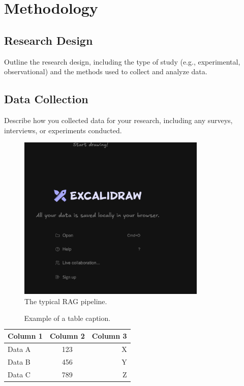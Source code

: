 \documentclass[12pt]{report}
\begin{document}
\newpage

\chapter{Methodology}
\section{Research Design}
Outline the research design, including the type of study (e.g., experimental, observational) and the methods used to collect and analyze data.
\section{Data Collection}
Describe how you collected data for your research, including any surveys, interviews, or experiments conducted.
\begin{figure}
    \centering
    \includegraphics[width=0.8\textwidth]{images/1/apa-ini.png}
    \caption{The typical RAG pipeline.}
    \label{fig:example2}
\end{figure}

\lipsum[1-2] %

\begin{table}[htbp]
  \centering
  \caption{Example of a table caption.}
  \label{tab:example1}
  \begin{tabular}{|l|c|r|}
    \hline
    Column 1 & Column 2 & Column 3 \\
    \hline
    Data A   & 123      & X \\
    Data B   & 456      & Y \\
    Data C   & 789      & Z \\
    \hline
  \end{tabular}
\end{table}
\end{document}
